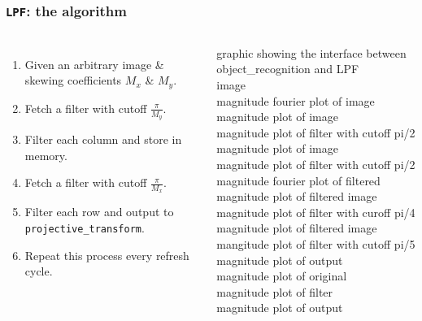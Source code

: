 \documentclass{beamer}
\begin{document}
\begin{frame}
	\frametitle{{\tt LPF}: the algorithm}
	\begin{columns}[c]
		\begin{enumerate}
		\item<1-> Given an arbitrary image \& skewing coefficients \( M_x \) \& \( M_y \).
		\item<2-> Fetch a filter with cutoff \( \frac{\pi}{M_y} \).
		\item<3-> Filter each column and store in memory.
		\item<4-> Fetch a filter with cutoff \( \frac{\pi}{M_x} \).
		\item<5-> Filter each row and output to {\tt projective\_transform}.
		\item<6-> Repeat this process every refresh cycle.
		\end{enumerate}

		{
			graphic showing the interface between object\_recognition and LPF \\
			image \\
			magnitude fourier plot of image \\
		}
		\only<2>
		{
			magnitude plot of image \\
			magnitude plot of filter with cutoff pi/2 \\
		}
		\only<3>
		{
			magnitude plot of image \\
			magnitude plot of filter with cutoff pi/2 \\
			magnitude fourier plot of filtered \\
		}
		\only<4>
		{
			magnitude plot of filtered image \\
			magnitude plot of filter with curoff pi/4 \\
		}
		\only<5>
		{
			magnitude plot of filtered image \\
			mangitude plot of filter with cutoff pi/5 \\
			magnitude plot of output \\
		}
		\only<6>
		{
			magnitude plot of original \\
			magnitude plot of filter \\
			magnitude plot of output \\
		}
	\end{columns}
\end{frame}

\end{document}
